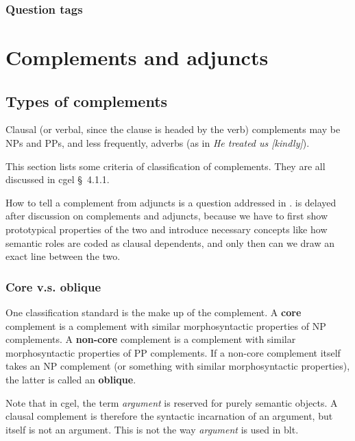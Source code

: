 \documentclass{article}
\newcommand*{\citesec}[1]{\S~{#1}}
\newcommand*{\concept}[1]{\textbf{#1}}
\newcommand*{\term}[1]{\emph{#1}}
\newcommand*{\corpus}[1]{\emph{#1}}
\begin{document}
\subsubsection{Question tags}\label{sec:question-tag}

\section{Complements and adjuncts}

\subsection{Types of complements}\label{sec:types-of-complements}

Clausal (or verbal, since the clause is headed by the verb) complements 
may be NPs and PPs, and less frequently, adverbs 
(as in \corpus{He treated us [kindly]}). %

This section lists some criteria of classification of complements.
They are all discussed in \ac{cgel} \citesec{4.1.1}.


How to tell a complement from adjuncts is a question addressed in .
 is delayed after discussion on complements and adjuncts,
because we have to first show prototypical properties of the two 
and introduce necessary concepts like how semantic roles are coded as clausal dependents,
and only then can we draw an exact line between the two.

\subsubsection{Core v.s. oblique}\label{sec:core-oblique}

One classification standard is the make up of the complement.
A \concept{core} complement is a complement with similar morphosyntactic properties of NP complements.
A \concept{non-core} complement is a complement with similar morphosyntactic properties of PP complements.
If a non-core complement itself takes an NP complement (or something with similar morphosyntactic properties),
the latter is called an \concept{oblique}.

Note that in \ac{cgel}, the term \term{argument} is reserved for purely semantic objects.
A clausal complement is therefore the syntactic incarnation of an argument,
but itself is not an argument.
This is not the way \term{argument} is used in \ac{blt}.
\end{document}
